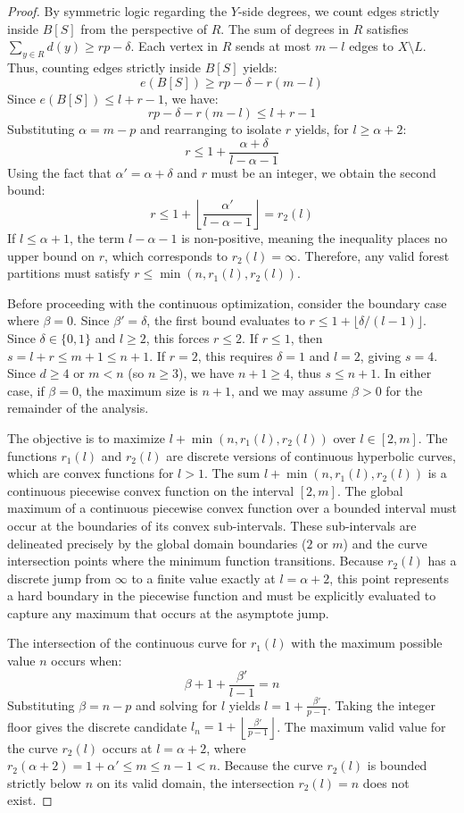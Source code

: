 \documentclass[10pt,a4paper]{amsart}
\begin{document}
\begin{proof}
By symmetric logic regarding the $Y$-side degrees, we count edges strictly inside $B[S]$ from the perspective of $R$.
The sum of degrees in $R$ satisfies $\sum_{y \in R} d(y) \ge rp - \delta$.
Each vertex in $R$ sends at most $m-l$ edges to $X \setminus L$.
Thus, counting edges strictly inside $B[S]$ yields:
\[ e(B[S]) \ge rp - \delta - r(m-l) \]
Since $e(B[S]) \le l+r-1$, we have:
\[ rp - \delta - r(m-l) \le l+r-1 \]
Substituting $\alpha = m-p$ and rearranging to isolate $r$ yields, for $l \ge \alpha + 2$:
\[ r \le 1 + \frac{\alpha + \delta}{l - \alpha - 1} \]
Using the fact that $\alpha' = \alpha + \delta$ and $r$ must be an integer, we obtain the second bound:
\[ r \le 1 + \left\lfloor \frac{\alpha'}{l - \alpha - 1} \right\rfloor = r_2(l) \]
If $l \le \alpha + 1$, the term $l - \alpha - 1$ is non-positive, meaning the inequality places no upper bound on $r$, which corresponds to $r_2(l) = \infty$.
Therefore, any valid forest partitions must satisfy $r \le \min(n, r_1(l), r_2(l))$.

Before proceeding with the continuous optimization, consider the boundary case where $\beta = 0$. Since $\beta' = \delta$, the first bound evaluates to $r \le 1 + \lfloor \delta / (l-1) \rfloor$. Since $\delta \in \{0, 1\}$ and $l \ge 2$, this forces $r \le 2$. If $r \le 1$, then $s = l + r \le m + 1 \le n + 1$. If $r = 2$, this requires $\delta = 1$ and $l = 2$, giving $s = 4$. Since $d \ge 4$ or $m < n$ (so $n \ge 3$), we have $n+1 \ge 4$, thus $s \le n+1$. In either case, if $\beta = 0$, the maximum size is $n+1$, and we may assume $\beta > 0$ for the remainder of the analysis.

The objective is to maximize $l + \min(n, r_1(l), r_2(l))$ over $l \in [2, m]$.
The functions $r_1(l)$ and $r_2(l)$ are discrete versions of continuous hyperbolic curves, which are convex functions for $l > 1$. The sum $l + \min(n, r_1(l), r_2(l))$ is a continuous piecewise convex function on the interval $[2, m]$. The global maximum of a continuous piecewise convex function over a bounded interval must occur at the boundaries of its convex sub-intervals. These sub-intervals are delineated precisely by the global domain boundaries ($2$ or $m$) and the curve intersection points where the minimum function transitions. Because $r_2(l)$ has a discrete jump from $\infty$ to a finite value exactly at $l = \alpha + 2$, this point represents a hard boundary in the piecewise function and must be explicitly evaluated to capture any maximum that occurs at the asymptote jump.

The intersection of the continuous curve for $r_1(l)$ with the maximum possible value $n$ occurs when:
\[ \beta + 1 + \frac{\beta'}{l-1} = n \]
Substituting $\beta = n - p$ and solving for $l$ yields $l = 1 + \frac{\beta'}{p-1}$.
Taking the integer floor gives the discrete candidate $l_n = 1 + \left\lfloor \frac{\beta'}{p-1} \right\rfloor$.
The maximum valid value for the curve $r_2(l)$ occurs at $l = \alpha + 2$, where $r_2(\alpha+2) = 1 + \alpha' \le m \le n - 1 < n$. Because the curve $r_2(l)$ is bounded strictly below $n$ on its valid domain, the intersection $r_2(l) = n$ does not exist.


\end{proof}
\end{document}
